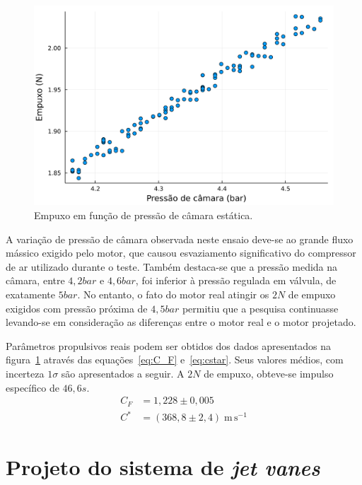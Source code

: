 \begin{figure}[htbp]
    \centering
    \includegraphics[width=\textwidth]{img/thrust_vs_chamber_pressure.png}
    \caption{Empuxo em função de pressão de câmara estática.}\label{fig:thrust_versus_p1}
\end{figure}

A variação de pressão de câmara observada neste ensaio deve-se ao grande fluxo mássico exigido pelo motor, que causou esvaziamento significativo do compressor de ar utilizado durante o teste. Também destaca-se que a pressão medida na câmara, entre \(4,2bar\) e \(4,6bar\), foi inferior à pressão regulada em válvula, de exatamente \(5bar\). No entanto, o fato do motor real atingir os \(2N\) de empuxo exigidos com pressão próxima de \(4,5bar\) permitiu que a pesquisa continuasse levando-se em consideração as diferenças entre o motor real e o motor projetado.

Parâmetros propulsivos reais podem ser obtidos dos dados apresentados na figura~\ref{fig:thrust_versus_p1} através das equações~\ref{eq:C_F} e~\ref{eq:cstar}. Seus valores médios, com incerteza \(1\sigma \) são apresentados a seguir. A \(2N\) de empuxo, obteve-se impulso específico de \(46,6s\).
\begin{align}
    C_F &= 1,228 \pm 0,005 \\
    C^* &= (368,8 \pm 2,4)\;\mathrm{m}\,\mathrm{s}^{-1}
\end{align}

\section{Projeto do sistema de \textit{jet vanes}}\label{sec:result_jet_vanes}

